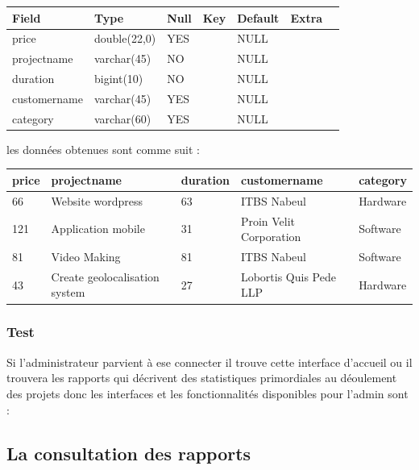 \begin{table}
\centering
\begin{tabular}{|l|l|l|l|l|l|l|}
\hline
Field        & Type         & Null & Key & Default & Extra &   \\
\hline
price        & double(22,0) & YES  &     & NULL    &       &   \\
\hline
projectname  & varchar(45)  & NO   &     & NULL    &       &   \\
\hline
duration     & bigint(10)   & NO   &     & NULL    &       &   \\
\hline
customername & varchar(45)  & YES  &     & NULL    &       &   \\
\hline
category     & varchar(60)  & YES  &     & NULL    &       &   \\
\hline
\end{tabular}
\end{table}
\FloatBarrier


les donn\'{e}es obtenues sont comme suit :
\begin{table}
\centering
\begin{tabular}{|l|l|l|l|l|}
\hline
price & projectname                   & duration & customername            & category  \\
\hline
66    & Website wordpress             & 63       & ITBS Nabeul             & Hardware  \\
\hline
121   & Application mobile            & 31       & Proin Velit Corporation & Software  \\
\hline
81    & Video Making                  & 81       & ITBS Nabeul             & Software  \\
\hline
43    & Create geolocalisation system & 27       & Lobortis Quis Pede LLP  & Hardware  \\
\hline
\end{tabular}
\end{table}
\FloatBarrier




\subsubsection{Test}

Si l'administrateur parvient \`{a} ese connecter il trouve cette interface d'accueil
ou il trouvera les rapports qui d\'{e}crivent des statistiques primordiales au
d\'{e}oulement des projets donc les interfaces et les fonctionnalit\'{e}s disponibles
pour l'admin sont :

\subsection{La consultation des rapports}


